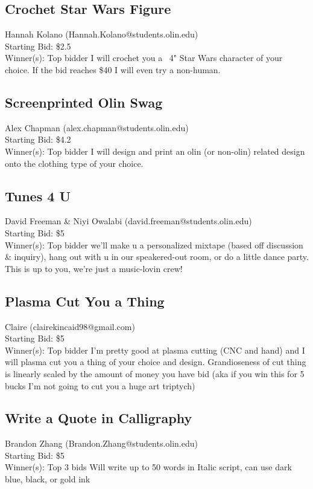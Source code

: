 \documentclass[11pt]{article}
\begin{document}
\subsection{Crochet Star Wars Figure}
Hannah Kolano (Hannah.Kolano@students.olin.edu) \\
Starting Bid: \$2.5 \\
Winner(s): 
Top bidder\newline
I will crochet you a ~4" Star Wars character of your choice. If the bid reaches \$40 I will even try a non-human.
\subsection{Screenprinted Olin Swag}
Alex Chapman (alex.chapman@students.olin.edu) \\
Starting Bid: \$4.2 \\
Winner(s): 
Top bidder\newline
I will design and print an olin (or non-olin) related design onto the clothing type of your choice.
\subsection{Tunes 4 U}
David Freeman \& Niyi Owalabi (david.freeman@students.olin.edu) \\
Starting Bid: \$5 \\
Winner(s): 
Top bidder\newline
we'll make u a personalized mixtape (based off discussion \& inquiry), hang out with u in our speakered-out room, or do a little dance party. This is up to you, we're just a music-lovin crew!
\subsection{Plasma Cut You a Thing}
Claire (clairekincaid98@gmail.com) \\
Starting Bid: \$5 \\
Winner(s): 
Top bidder\newline
I'm pretty good at plasma cutting (CNC and hand) and I will plasma cut you a thing of your choice and design.  Grandioseness of cut thing is linearly scaled by the amount of money you have bid (aka if you win this for 5 bucks I'm not going to cut you a huge art triptych)
\subsection{Write a Quote in Calligraphy}
Brandon Zhang (Brandon.Zhang@students.olin.edu) \\
Starting Bid: \$5 \\
Winner(s): 
Top 3 bids\newline
Will write up to 50 words in Italic script, can use dark blue, black, or gold ink
\end{document}
